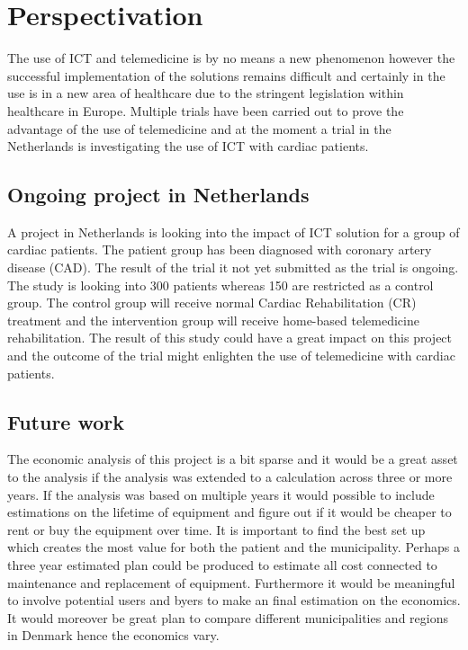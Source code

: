 



\chapter{Perspectivation}

The use of ICT and telemedicine is by no means a new phenomenon however the successful implementation of the solutions remains difficult and certainly in the use is in a new area of healthcare due to the stringent legislation within healthcare in Europe. Multiple trials have been carried out to prove the advantage of the use of telemedicine and at the moment a trial in the Netherlands is investigating the use of ICT with cardiac patients. 


\section{Ongoing project in Netherlands}

A project in Netherlands is looking into the impact of ICT solution for a group of cardiac patients. The patient group has been diagnosed with coronary artery disease (CAD). The result of the trial it not yet submitted as the trial is ongoing. The study is looking into 300 patients whereas 150 are restricted as a control group. The control group will receive normal Cardiac Rehabilitation (CR) treatment and the intervention group will receive home-based telemedicine rehabilitation\cite{CAD}. 
The result of this study could have a great impact on this project and the outcome of the trial might enlighten the use of telemedicine with cardiac patients.

\section{Future work}


The economic analysis of this project is a bit sparse and it would be a great asset to the analysis if the analysis was extended to a calculation across three or more years. If the analysis was based on multiple years it would possible to include estimations on the lifetime of equipment and figure out if it would be cheaper to rent or buy the equipment over time. It is important to find the best set up which creates the most value for both the patient and the municipality. Perhaps a three year estimated plan could be produced to estimate all cost connected to maintenance and replacement of equipment. Furthermore it would be meaningful to involve potential users and byers to make an final estimation on the economics. 
It would moreover be great plan to compare different municipalities and regions in Denmark hence the economics vary. \\

